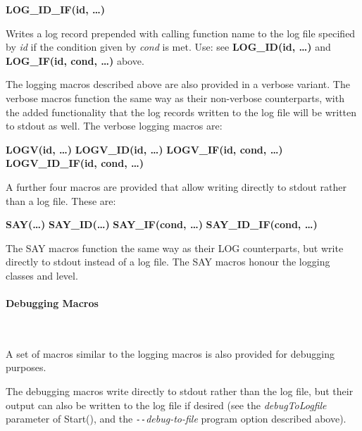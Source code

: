 \bigskip
\textbf{LOG\_ID\_IF(id, {\dots})}

Writes a log record prepended with calling function name to the log file specified by \textit{id} if the condition given by \textit{cond} is met.  Use: see \textbf{LOG\_ID(id, {\dots})} and \textbf{LOG\_IF(id, cond, {\dots})} above.

\bigskip
The logging macros described above are also provided in a verbose variant.  The verbose macros function the same way as their non-verbose counterparts, with the added functionality that the log records written to the log file will be written to stdout as well.  The verbose logging macros are:

\tabto{3em}\textbf{LOGV(id, {\dots})}
\tabto{3em}\textbf{LOGV\_ID(id, {\dots})}
\tabto{3em}\textbf{LOGV\_IF(id, cond, {\dots})}
\tabto{3em}\textbf{LOGV\_ID\_IF(id, cond, {\dots})}

\bigskip
\noindent A further four macros are provided that allow writing directly to stdout rather than a log file.  These are:

\tabto{3em}\textbf{SAY({\dots})}
\tabto{3em}\textbf{SAY\_ID({\dots})}
\tabto{3em}\textbf{SAY\_IF(cond, {\dots})}
\tabto{3em}\textbf{SAY\_ID\_IF(cond, {\dots})}

The SAY macros function the same way as their LOG counterparts, but write directly to stdout instead of a log file.  The SAY macros honour the logging classes and level.

\bigskip
\paragraph{Debugging Macros}\label{sec:DebuggingMacros}\mbox{} \\

\par
A set of macros similar to the logging macros is also provided for debugging purposes.  

The debugging macros write directly to stdout rather than the log file, but their output can also be written to the log file if desired (see the \textit{debugToLogfile} parameter of Start(), and the \textit{\texttt{-{}-}debug-to-file} program option described above).

